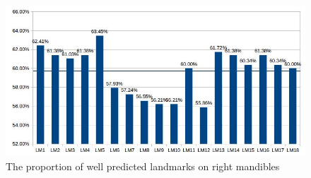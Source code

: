 \documentclass[12pt,a4paper]{article}
\begin{document}
\begin{figure}[h!]
	\centering
	\includegraphics[scale=0.65]{images/md}
	\caption{The proportion of well predicted landmarks on right mandibles}
	\label{mdfig}
\end{figure}
\end{document}
